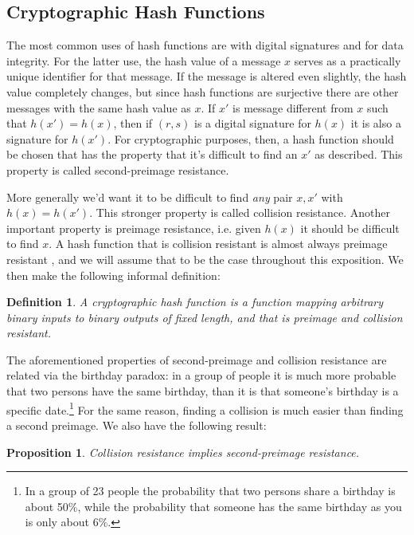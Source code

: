 \documentclass[a4paper,12pt]{article}
\newtheorem*{mydef}{Definition}
\newtheorem*{proposition}{Proposition}
\begin{document}
\subsection{Cryptographic Hash Functions}

The most common uses of hash functions are with digital signatures and for data integrity. \cite[p. 321]{menezes} For the latter use, the hash value of a message $x$ serves as a practically unique identifier for that message. If the message is altered even slightly, the hash value completely changes, but since hash functions are surjective there are other messages with the same hash value as $x$. If $x'$ is message different from $x$ such that $h(x') = h(x)$, then if $(r,s)$ is a digital signature for $h(x)$ it is also a signature for $h(x')$. For cryptographic purposes, then, a hash function should be chosen that has the property that it's difficult to find an $x'$ as described. This property is called second-preimage resistance.

More generally we'd want it to be difficult to find \textit{any} pair $x,x'$ with $h(x)=h(x')$. This stronger property is called collision resistance. Another important property is preimage resistance, i.e. given $h(x)$ it should be difficult to find $x$. A hash function that is collision resistant is almost always preimage resistant \cite[p. 324]{menezes}, and we will assume that to be the case throughout this exposition. We then make the following informal definition:

\begin{mydef}
A cryptographic hash function is a function mapping arbitrary binary inputs to binary outputs of fixed length, and that is preimage and collision resistant.
\end{mydef}

The aforementioned properties of second-preimage and collision resistance are related via the birthday paradox: in a group of people it is much more probable that two persons have the same birthday, than it is that someone's birthday is a specific date.\footnote{In a group of 23 people the probability that two persons share a birthday is about 50\%, while the probability that someone has the same birthday as you is only about 6\%.} For the same reason, finding a collision is much easier than finding a second preimage. We also have the following result:

\begin{proposition}
Collision resistance implies second-preimage resistance.
\end{proposition}
\end{document}
